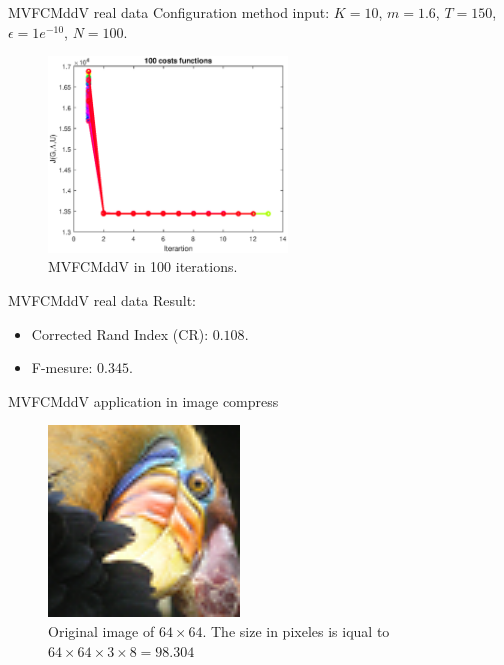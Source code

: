 \documentclass{beamer}
\begin{document}
\begin{frame}{MVFCMddV real data}
Configuration method input:
$K =10$, $m = 1.6$, $T = 150$, $\epsilon = 1e^{-10}$, $N = 100$.
\begin{figure}[h]
\centering
\includegraphics[width=2.5in]{../out/cost-function-mvfcmddv.eps}
\caption{MVFCMddV in 100 iterations.}
\label{fig:data_base}
\end{figure}
\end{frame}

\begin{frame}{MVFCMddV real data}
Result: 
\begin{itemize}
\item Corrected Rand Index (CR): $0.108$.
\item F-mesure: $0.345$. 
\end{itemize}
\end{frame}


\begin{frame}{MVFCMddV application in image compress}
\begin{figure}[h]
\centering
\includegraphics[width=2.0in]{../out/bird_small.png} 
\caption{Original image of $64 \times 64$. The size in pixeles is iqual to  $64\times64\times3\times8 = 98.304$ }
\label{fig:lab}
\end{figure}
\end{frame}
\end{document}
